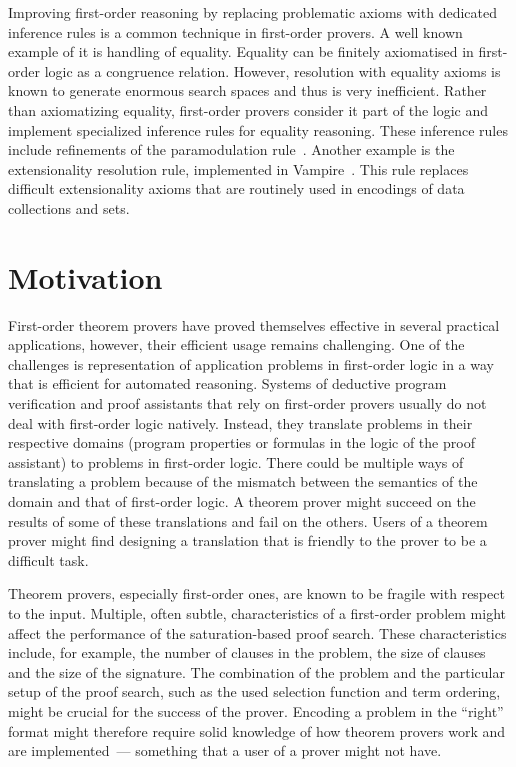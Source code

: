 Improving first-order reasoning by replacing problematic axioms with dedicated inference rules is a common technique in first-order provers. A well known example of it is handling of equality. Equality can be finitely axiomatised in first-order logic as a congruence relation. However, resolution with equality axioms is known to generate enormous search spaces and thus is very inefficient. Rather than axiomatizing equality, first-order provers consider it part of the logic and implement specialized inference rules for equality reasoning. These inference rules include refinements of the paramodulation rule~\cite{WRCS67,Robinson1969}. Another example is the extensionality resolution rule, implemented in Vampire~\cite{ATVA14}. This rule replaces difficult extensionality axioms that are routinely used in encodings of data collections and sets.


\section*{Motivation}
First-order theorem provers have proved themselves effective in several practical applications, however, their efficient usage remains challenging. One of the challenges is representation of application problems in first-order logic in a way that is efficient for automated reasoning. Systems of deductive program verification and proof assistants that rely on first-order provers usually do not deal with first-order logic natively. Instead, they translate problems in their respective domains (program properties or formulas in the logic of the proof assistant) to problems in first-order logic. There could be multiple ways of translating a problem because of the mismatch between the semantics of the domain and that of first-order logic. A theorem prover might succeed on the results of some of these translations and fail on the others. Users of a theorem prover might find designing a translation that is friendly to the prover to be a difficult task.

Theorem provers, especially first-order ones, are known to be fragile with respect to the input. Multiple, often subtle, characteristics of a first-order problem might affect the performance of the saturation-based proof search. These characteristics include, for example, the number of clauses in the problem, the size of clauses and the size of the signature. The combination of the problem and the particular setup of the proof search, such as the used selection function and term ordering, might be crucial for the success of the prover. Encoding a problem in the ``right'' format might therefore require solid knowledge of how theorem provers work and are implemented~--- something that a user of a prover might not have.

